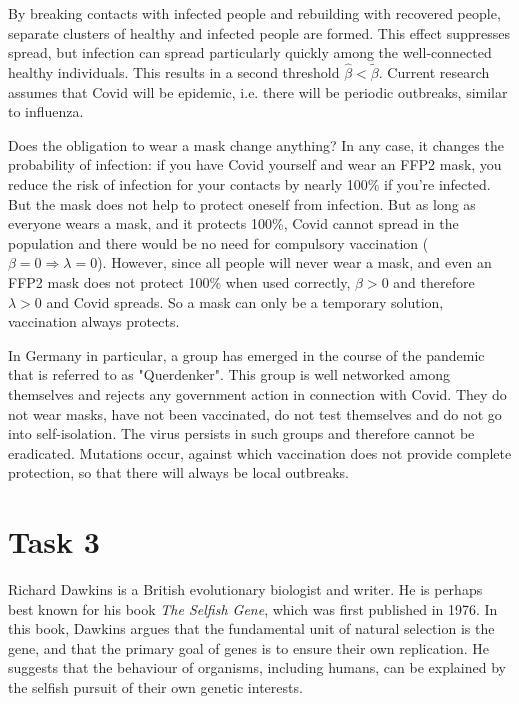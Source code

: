 \documentclass{article}
\begin{document}
	By breaking contacts with infected people and rebuilding with recovered people, separate clusters of healthy and infected people are formed. This effect suppresses spread, but infection can spread particularly quickly among the well-connected healthy individuals. This results in a second threshold $\hat{\beta} < \tilde{\beta}$. Current research assumes that Covid will be epidemic, i.e. there will be periodic outbreaks, similar to influenza. \cite{telenti_after_2021}
	
	Does the obligation to wear a mask change anything? In any case, it changes the probability of infection: if you have Covid yourself and wear an FFP2 mask, you reduce the risk of infection for your contacts by nearly 100\% if you’re infected. But the mask does not help to protect oneself from infection. But as long as everyone wears a mask, and it protects 100\%, Covid cannot spread in the population and there would be no need for compulsory vaccination ($\beta = 0 \Rightarrow \lambda = 0$). However, since all people will never wear a mask, and even an FFP2 mask does not protect 100\% when used correctly, $\beta > 0$ and therefore $\lambda > 0$ and Covid spreads. So a mask can only be a temporary solution, vaccination always protects. \cite{noauthor_how_nodate}
	
	In Germany in particular, a group has emerged in the course of the pandemic that is referred to as "Querdenker". This group is well networked among themselves and rejects any government action in connection with Covid. They do not wear masks, have not been vaccinated, do not test themselves and do not go into self-isolation. The virus persists in such groups and therefore cannot be eradicated. Mutations occur, against which vaccination does not provide complete protection, so that there will always be local outbreaks.
	
	\section*{Task 3}
	
	Richard Dawkins is a British evolutionary biologist and writer. He is perhaps best known for his book \textit{The Selfish Gene}, which was first published in 1976. In this book, Dawkins argues that the fundamental unit of natural selection is the gene, and that the primary goal of genes is to ensure their own replication. He suggests that the behaviour of organisms, including humans, can be explained by the selfish pursuit of their own genetic interests.
	
\end{document}
